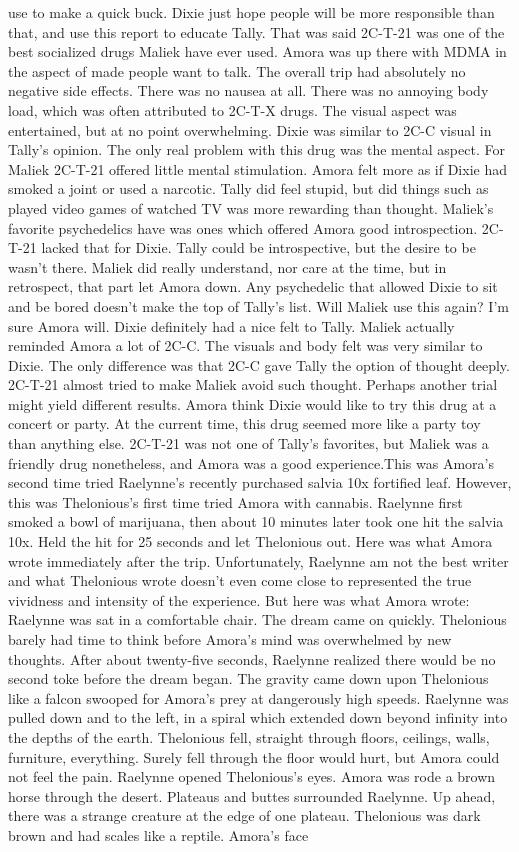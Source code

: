 \documentclass[12pt]{book}
\begin{document}
use to make a quick buck. Dixie just hope people will be more responsible than that, and use this report to educate Tally. That was said 2C-T-21 was one of the best socialized drugs Maliek have ever used. Amora was up there with MDMA in the aspect of made people want to talk. The overall trip had absolutely no negative side effects. There was no nausea at all. There was no annoying body load, which was often attributed to 2C-T-X drugs. The visual aspect was entertained, but at no point overwhelming. Dixie was similar to 2C-C visual in Tally's opinion. The only real problem with this drug was the mental aspect. For Maliek 2C-T-21 offered little mental stimulation. Amora felt more as if Dixie had smoked a joint or used a narcotic. Tally did feel stupid, but did things such as played video games of watched TV was more rewarding than thought. Maliek's favorite psychedelics have was ones which offered Amora good introspection. 2C-T-21 lacked that for Dixie. Tally could be introspective, but the desire to be wasn't there. Maliek did really understand, nor care at the time, but in retrospect, that part let Amora down. Any psychedelic that allowed Dixie to sit and be bored doesn't make the top of Tally's list. Will Maliek use this again? I'm sure Amora will. Dixie definitely had a nice felt to Tally. Maliek actually reminded Amora a lot of 2C-C. The visuals and body felt was very similar to Dixie. The only difference was that 2C-C gave Tally the option of thought deeply. 2C-T-21 almost tried to make Maliek avoid such thought. Perhaps another trial might yield different results. Amora think Dixie would like to try this drug at a concert or party. At the current time, this drug seemed more like a party toy than anything else. 2C-T-21 was not one of Tally's favorites, but Maliek was a friendly drug nonetheless, and Amora was a good experience.This was Amora's second time tried Raelynne's recently purchased salvia 10x fortified leaf. However, this was Thelonious's first time tried Amora with cannabis. Raelynne first smoked a bowl of marijuana, then about 10 minutes later took one hit the salvia 10x. Held the hit for 25 seconds and let Thelonious out. Here was what Amora wrote immediately after the trip. Unfortunately, Raelynne am not the best writer and what Thelonious wrote doesn't even come close to represented the true vividness and intensity of the experience. But here was what Amora wrote: Raelynne was sat in a comfortable chair. The dream came on quickly. Thelonious barely had time to think before Amora's mind was overwhelmed by new thoughts. After about twenty-five seconds, Raelynne realized there would be no second toke before the dream began. The gravity came down upon Thelonious like a falcon swooped for Amora's prey at dangerously high speeds. Raelynne was pulled down and to the left, in a spiral which extended down beyond infinity into the depths of the earth. Thelonious fell, straight through floors, ceilings, walls, furniture, everything. Surely fell through the floor would hurt, but Amora could not feel the pain. Raelynne opened Thelonious's eyes. Amora was rode a brown horse through the desert. Plateaus and buttes surrounded Raelynne. Up ahead, there was a strange creature at the edge of one plateau. Thelonious was dark brown and had scales like a reptile. Amora's face 
\end{document}
